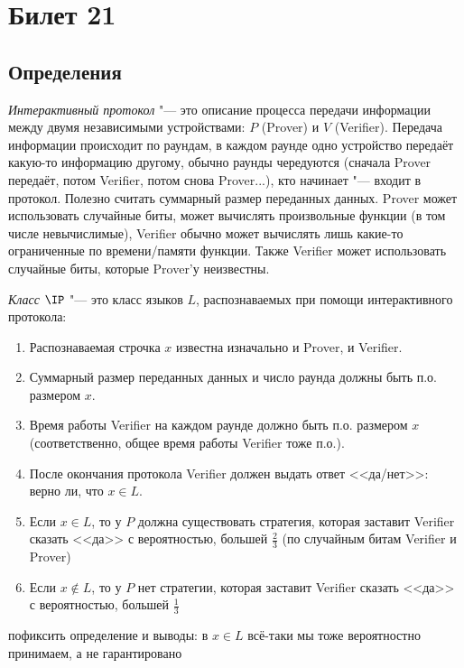 \setcounter{section}{20}
\section{Билет 21}
\subsection{Определения}
	\begin{Def}
		\textit{Интерактивный протокол} "--- это описание процесса передачи информации между двумя независимыми устройствами: $P$ (Prover) и $V$ (Verifier).
		Передача информации происходит по раундам, в каждом раунде одно устройство передаёт какую-то информацию другому, обычно раунды чередуются
		(сначала Prover передаёт, потом Verifier, потом снова Prover...), кто начинает "--- входит в протокол.
		Полезно считать суммарный размер переданных данных.
		Prover может использовать случайные биты, может вычислять произвольные функции (в том числе невычислимые), Verifier обычно может вычислять лишь какие-то ограниченные по времени/памяти функции.
		Также Verifier может использовать случайные биты, которые Prover'у неизвестны.
	\end{Def}
	\begin{Def}
		\textit{Класс $\IP$} "--- это класс языков $L$, распознаваемых при помощи интерактивного протокола:
		\begin{enumerate}
			\item Распознаваемая строчка $x$ известна изначально и Prover, и Verifier.
			\item Суммарный размер переданных данных и число раунда должны быть п.о. размером $x$.
			\item Время работы Verifier на каждом раунде должно быть п.о. размером $x$ (соответственно, общее время работы Verifier тоже п.о.).
			\item После окончания протокола Verifier должен выдать ответ <<да/нет>>: верно ли, что $x \in L$.
			\item Если $x \in L$, то у $P$ должна существовать стратегия, которая заставит Verifier сказать <<да>> с вероятностью, большей $\frac 23$ (по случайным битам Verifier и Prover)
			\item Если $x \notin L$, то у $P$ нет стратегии, которая заставит Verifier сказать <<да>> с вероятностью, большей $\frac 13$
		\end{enumerate}
	\end{Def}
	\TODO пофиксить определение и выводы: в $x \in L$ всё-таки мы тоже вероятностно принимаем, а не гарантировано
